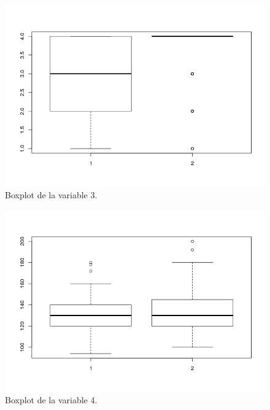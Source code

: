\documentclass[12pt,a4paper]{article}
\begin{document}
\begin{figure}[H]
	\centering
	\includegraphics[scale=0.6]{./Imagenes/EDA/Clasificacion/boxplot_variable3.png}
	\caption{Boxplot de la variable 3.}
\end{figure}

\begin{figure}[H]
	\centering
	\includegraphics[scale=0.6]{./Imagenes/EDA/Clasificacion/boxplot_variable4.png}
	\caption{Boxplot de la variable 4.}
\end{figure}
\end{document}
